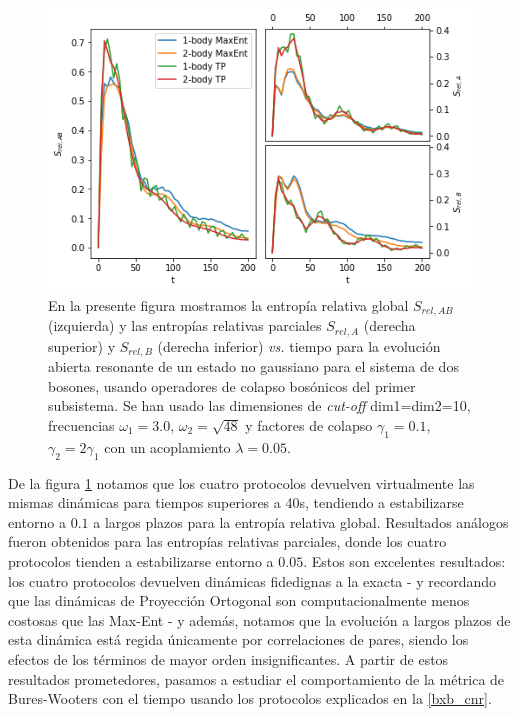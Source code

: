 \documentclass{report} %
\numberwithin{equation}{section}
\begin{document}
\begin{figure}
    \centering
    \includegraphics[scale=0.6]{figs/section3_4/section5_bxb-open-nonres/rel_entropy_open_nonres_ng.png}
    \caption{En la presente figura mostramos la entropía relativa global $S_{rel,AB}$ (izquierda) y las entropías relativas parciales $S_{rel,A}$ (derecha superior) y $S_{rel,B}$ (derecha inferior) \textit{vs.} tiempo para la evolución abierta resonante de un estado no gaussiano para el sistema de dos bosones, usando operadores de colapso bosónicos del primer subsistema. Se han usado las dimensiones de \textit{cut-off} dim1=dim2=10, frecuencias $\omega_1 = 3.0$, $\omega_2 = \sqrt{48}$ y factores de colapso $\gamma_1 = 0.1$, $\gamma_2 = 2 \gamma_1$ con un acoplamiento $\lambda = 0.05$.}
    \label{rel_entropy_open_nonres}
\end{figure}

De la figura \ref{rel_entropy_open_nonres} notamos que los cuatro protocolos devuelven virtualmente las mismas dinámicas para tiempos superiores a 40s, tendiendo a estabilizarse entorno a $0.1$ a largos plazos para la entropía relativa global. Resultados análogos fueron obtenidos para las entropías relativas parciales, donde los cuatro protocolos tienden a estabilizarse entorno a $0.05$. Estos son excelentes resultados: los cuatro protocolos devuelven dinámicas fidedignas a la exacta - y recordando que las dinámicas de Proyección Ortogonal son computacionalmente menos costosas que las Max-Ent - y además, notamos que la evolución a largos plazos de esta dinámica está regida únicamente por correlaciones de pares, siendo los efectos de los términos de mayor orden insignificantes. A partir de estos resultados prometedores, pasamos a estudiar el comportamiento de la métrica de Bures-Wooters con el tiempo usando los protocolos explicados en la \autoref{bxb_cnr}. 
\end{document}
